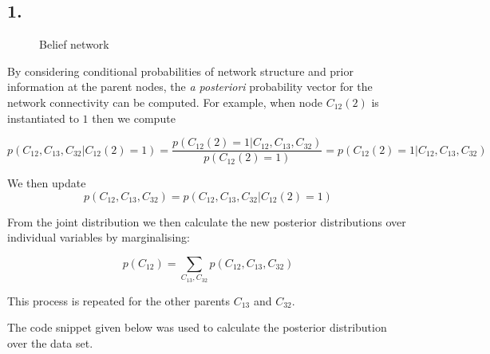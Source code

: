 \documentclass[11pt,a4paper,oneside]{report}
\begin{document}
\subsection*{1.}
\begin{figure}[H]
  \centering
    \caption{Belief network}
    \label{fig:all_trade_cca_black}     
\end{figure}



By considering conditional probabilities of network structure and prior 
information at the parent nodes, the \emph{a 
posteriori} probability vector for the network connectivity can be computed. For 
example, when node $C_12(2)$ is instantiated to $1$ then we compute

$$ p(C_{12}, C_{13}, C_{32} | C_{12}(2) = 1) = \frac{p(C_{12}(2) = 1 | 
C_{12}, C_{13}, C_{32})}{p(C_{12}(2) = 1)} = p(C_{12}(2) = 1 | 
C_{12}, C_{13}, C_{32})$$

We then update $$p(C_{12}, C_{13}, C_{32}) = 
p(C_{12}, C_{13}, C_{32} | C_{12}(2) = 1)$$

From the joint distribution we then calculate the new posterior distributions 
over individual variables by marginalising:

$$p(C_{12}) = \sum_{C_{13},C_{32}}p(C_{12}, C_{13}, C_{32})$$

This process is repeated for the other parents $C_{13}$ and $C_{32}$.

The code snippet given below was used to calculate the posterior 
distribution over the data set.
\end{document}
